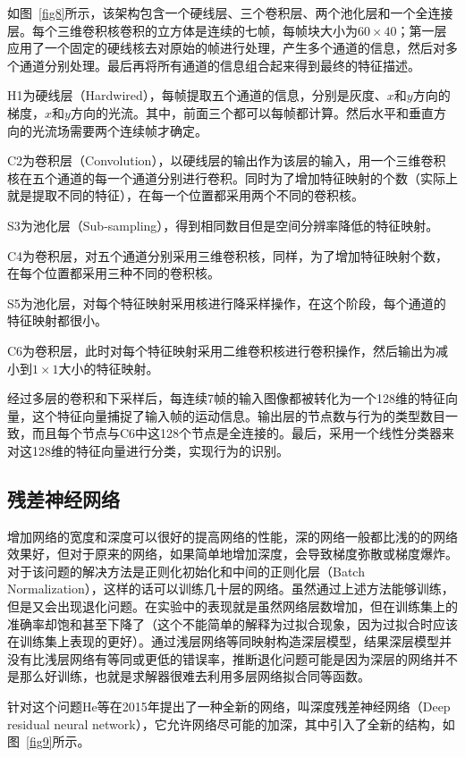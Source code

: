 如图~\ref{fig8}所示，该架构包含一个硬线层、三个卷积层、两个池化层和一个全连接层。每个三维卷积核卷积的立方体是连续的七帧，每帧块大小为$60\times40$；第一层应用了一个固定的硬线核去对原始的帧进行处理，产生多个通道的信息，然后对多个通道分别处理。最后再将所有通道的信息组合起来得到最终的特征描述。

H1为硬线层（Hardwired），每帧提取五个通道的信息，分别是灰度、$x$和$y$方向的梯度，$x$和$y$方向的光流。其中，前面三个都可以每帧都计算。然后水平和垂直方向的光流场需要两个连续帧才确定。

C2为卷积层（Convolution），以硬线层的输出作为该层的输入，用一个三维卷积核在五个通道的每一个通道分别进行卷积。同时为了增加特征映射的个数（实际上就是提取不同的特征），在每一个位置都采用两个不同的卷积核。

S3为池化层（Sub-sampling），得到相同数目但是空间分辨率降低的特征映射。

C4为卷积层，对五个通道分别采用三维卷积核，同样，为了增加特征映射个数，在每个位置都采用三种不同的卷积核。

S5为池化层，对每个特征映射采用核进行降采样操作，在这个阶段，每个通道的特征映射都很小。

C6为卷积层，此时对每个特征映射采用二维卷积核进行卷积操作，然后输出为减小到$1×1$大小的特征映射。

经过多层的卷积和下采样后，每连续7帧的输入图像都被转化为一个128维的特征向量，这个特征向量捕捉了输入帧的运动信息。输出层的节点数与行为的类型数目一致，而且每个节点与C6中这128个节点是全连接的。最后，采用一个线性分类器来对这128维的特征向量进行分类，实现行为的识别。

\subsection{残差神经网络}

增加网络的宽度和深度可以很好的提高网络的性能，深的网络一般都比浅的的网络效果好，但对于原来的网络，如果简单地增加深度，会导致梯度弥散或梯度爆炸。对于该问题的解决方法是正则化初始化和中间的正则化层（Batch Normalization），这样的话可以训练几十层的网络。虽然通过上述方法能够训练，但是又会出现退化问题。在实验中的表现就是虽然网络层数增加，但在训练集上的准确率却饱和甚至下降了（这个不能简单的解释为过拟合现象，因为过拟合时应该在训练集上表现的更好）。通过浅层网络等同映射构造深层模型，结果深层模型并没有比浅层网络有等同或更低的错误率，推断退化问题可能是因为深层的网络并不是那么好训练，也就是求解器很难去利用多层网络拟合同等函数。

针对这个问题He等在2015年提出了一种全新的网络，叫深度残差神经网络（Deep residual neural network），它允许网络尽可能的加深，其中引入了全新的结构，如图~\ref{fig9}所示\citep{he2016deep}。

